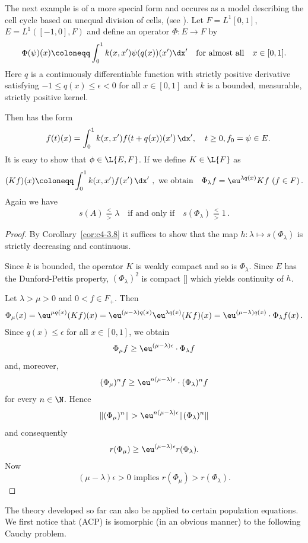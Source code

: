 \begin{example}\label{ex:c4-3.11}
The next example is of a more special form and occures as a model describing the cell cycle based on unequal division of cells, (see  \textcite{arinokimmel:1985}).
Let $F = L^{1}[0,1]$,\, $E = L^{1}([-1,0], F)$ and define an operator $\Phi \colon E \to F$ by
\[
\Phi(\psi)(x) \coloneqq \int_0^1 k(x,x')\psi(q(x))(x') \dx' \quad \text{for almost all} \quad x \in [0,1].
\]
Here $q$ is a continuously differentiable function with strictly positive derivative satisfying $-1 \leq q(x) \leq \epsilon < 0$ for all $x \in [0,1]$ and $k$ is a bounded, measurable, strictly positive kernel.

Then  has the form
\begin{equation} \label{eq:c4-3.12}
\quad f(t)(x) = \int_{0}^{1} k(x,x')f(t+q(x))(x') \, \dx', \quad t \geq 0, f_{0} = \psi \in E.
\end{equation}
It is easy to show that $\phi \in \L{E,F}$.
If we define $K \in \L{F}$  as 
\[
(Kf)(x) \coloneqq \int_{0}^{1} k(x,x')f(x') \, \dx' \ ,
\ \text{we obtain} \quad 
\Phi_{\lambda}f = \eu^{\lambda q(x)}Kf \,\, (f \in F)\,.
\]
Again we have 
\begin{equation*}\label{eq:c4-3.12-kgk1}
s(A) \overset{<}{ \underset{>}{=} }\lambda \quad \text{if and only if} \quad s(\Phi_{\lambda}) \overset{<}{ \underset{>}{=} } 1 \,.
\end{equation*}
\end{example}
\begin{proof}
By Corollary~\ref{cor:c4-3.8} it suffices to show that the map $h \colon \lambda \mapsto s(\Phi_{\lambda})$ is strictly decreasing and continuous.

Since $k$ is bounded, the operator $K$ is weakly compact and so is $\Phi_{\lambda}$.
Since $E$ has the Dunford-Pettis property, $(\Phi_{\lambda})^{2}$ is compact [\textcite[Theorem II.9.9]{schaefer:1974}] which yields continuity of\/ $h$.

Let $\lambda > \mu > 0$ and $0 < f \in F_{+}$.
Then 
\[
\Phi_{\mu}(x) = 
\eu^{\mu q(x)}(Kf)(x) = 
\eu^{(\mu-\lambda)q(x)}\eu^{\lambda q(x)}(Kf)(x) =
\eu^{(\mu-\lambda)q(x)} \cdot \Phi_{\lambda}f(x)\,.
\]
Since $q(x) \leq \epsilon$ for all $x \in [0,1]$, we obtain 
\[
\Phi_{\mu}f \geq \eu^{(\mu-\lambda)\epsilon} \cdot \Phi_{\lambda}f
\]
and, moreover, 
\[
(\Phi_{\mu})^n f \geq \eu^{n(\mu-\lambda)\epsilon} \cdot (\Phi_{\lambda})^n f
\]
for every $n \in \N$.
Hence 
\[
\|(\Phi_{\mu})^n\| > \eu^{n(\mu-\lambda)\epsilon}\|(\Phi_{\lambda})^n\|
\]
and consequently 
\[
r(\Phi_{\mu}) \geq \eu^{(\mu-\lambda)\epsilon}r(\Phi_{\lambda}) .
\]
Now 
\[
\text{$(\mu-\lambda)\epsilon > 0$ implies 
$r(\Phi_{\mu}) > r(\Phi_{\lambda})$.}
\]
\end{proof}
The theory developed so far can also be applied to certain population equations.
We first notice that (ACP) is isomorphic (in an obvious manner) to the following Cauchy problem.

